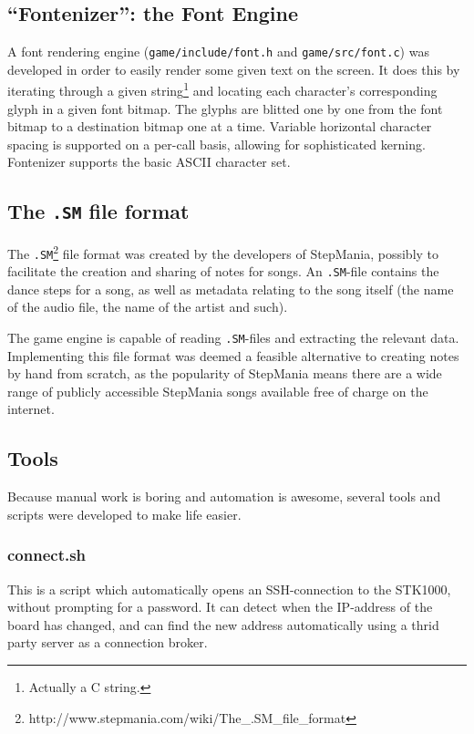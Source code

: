 \subsection{``Fontenizer'': the Font Engine}
	A font rendering engine (\texttt{game/include/font.h} and \texttt{game/src/font.c}) was developed in order to easily render some given text on the screen.
	It does this by iterating through a given string\footnote{Actually a C string.} and locating each character's corresponding glyph in a given font bitmap.
	The glyphs are blitted one by one from the font bitmap to a destination bitmap one at a time.
    Variable horizontal character spacing is supported on a per-call basis, allowing for sophisticated kerning.
    Fontenizer supports the basic ASCII character set.
        
\subsection{The \texttt{.SM} file format}
The \texttt{.SM}\footnote{http://www.stepmania.com/wiki/The_.SM_file_format} file format was created by the developers of StepMania, possibly to facilitate the creation and sharing of notes for songs.
An \texttt{.SM}-file contains the dance steps for a song, as well as metadata relating to the song itself (the name of the audio file, the name of the artist and such).

The game engine is capable of reading \texttt{.SM}-files and extracting the relevant data.
Implementing this file format was deemed a feasible alternative to creating notes by hand from scratch, as the popularity of StepMania means there are a wide range of publicly accessible StepMania songs available free of charge on the internet.

\subsection{Tools}

Because manual work is boring and automation is awesome, several tools and scripts were developed to make life easier.
\subsubsection{connect.sh}
This is a script which automatically opens an SSH-connection to the STK1000, without prompting for a password. It can detect when the IP-address of the board has changed, and can find the new address automatically using a thrid party server as a connection broker.

